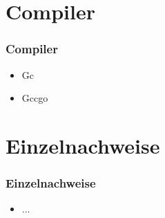 \documentclass{beamer}
\begin{document}
\section{Compiler}
\begin{frame}
\frametitle{Compiler}

\begin{itemize}
\setlength{\itemsep}{20pt}
\item Gc
\item Gccgo
\end{itemize}

\end{frame}

\section{Einzelnachweise}
\begin{frame}
\frametitle{Einzelnachweise}

\begin{itemize}
\setlength{\itemsep}{20pt}
\item ...
\end{itemize}

\end{frame}
\end{document}
